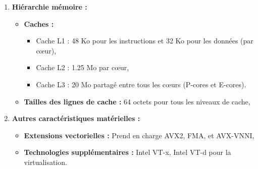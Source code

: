 \documentclass{rapport}
\begin{document}
\begin{enumerate}
          \item \textbf{Hiérarchie mémoire :}

            \begin{itemize}
                \item \textbf{Caches :}
                    \begin{itemize}
                        \item Cache L1 : 48 Ko pour les instructions et 32 Ko pour les données (par cœur),
                        \item Cache L2 : 1.25 Mo par cœur,
                        \item Cache L3 : 20 Mo partagé entre tous les cœurs (P-cores et E-cores).
                    \end{itemize}
                \item \textbf{Tailles des lignes de cache :} 64 octets pour tous les niveaux de cache,
            \end{itemize}
          
          \item \textbf{Autres caractéristiques matérielles :}

            \begin{itemize}
                \item \textbf{Extensions vectorielles :} Prend en charge AVX2, FMA, et AVX-VNNI,
                \item \textbf{Technologies supplémentaires :} Intel VT-x, Intel VT-d pour la virtualisation.
            \end{itemize}
          
        \end{enumerate}
        
      
\end{document}
